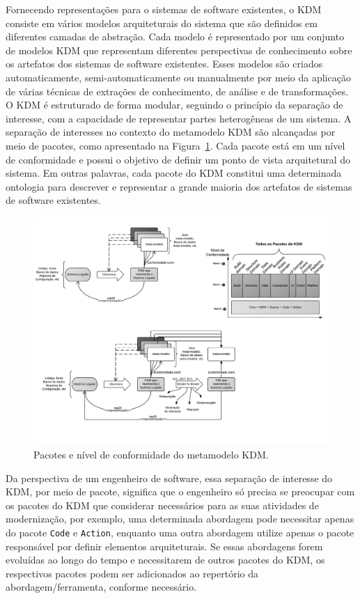 \documentclass[12pt]{article}
\begin{document}
Fornecendo representações para o sistemas de software existentes, o KDM consiste em vários modelos arquiteturais do sistema que são definidos em diferentes camadas de abstração. Cada modelo é representado por um conjunto de modelos KDM que representam diferentes perspectivas de conhecimento sobre os artefatos dos sistemas de software existentes. Esses modelos são criados automaticamente, semi-automaticamente ou manualmente por meio da aplicação de várias técnicas de extrações de conhecimento, de análise e de transformações. O KDM é estruturado de forma modular, seguindo o princípio da separação de interesse, com a capacidade de representar partes heterogêneas de um sistema. A separação de interesses no contexto do metamodelo KDM são alcançadas por meio de pacotes, como apresentado na Figura~\ref{kdm:domain}. Cada pacote está em um nível de conformidade e possui o objetivo de definir um ponto de vista arquitetural do sistema. Em outras palavras, cada pacote do KDM constitui uma determinada ontologia para descrever e representar a grande maioria dos artefatos de sistemas de software existentes. 

\begin{figure}[htb]
 \centering
 \includegraphics[scale=1]{kdmLevels_pacotes.pdf}
 \caption{Pacotes e nível de conformidade do metamodelo KDM.}
 \label{kdm:domain} 
\end{figure}

Da perspectiva de um engenheiro de software, essa separação de interesse do KDM, por meio de pacote, significa que o engenheiro só precisa se preocupar com os pacotes do KDM que considerar necessários para as suas atividades de modernização, por exemplo, uma determinada abordagem pode necessitar apenas do pacote \texttt{Code} e \texttt{Action}, enquanto uma outra abordagem utilize apenas o pacote responsável por definir elementos arquiteturais. Se essas abordagens forem evoluídas ao longo do tempo e necessitarem de outros pacotes do KDM, os respectivos pacotes podem ser adicionados ao repertório da abordagem/ferramenta, conforme necessário.
\end{document}
